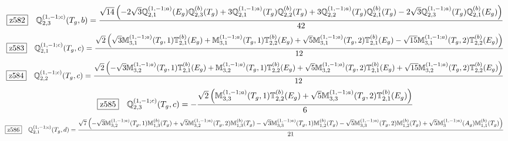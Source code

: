 \documentclass[fleqn,10pt,landscape]{jsarticle}
\begin{document}
\begin{dmath*}
\hspace*{3mm}\fbox{z582}\quad \mathbb{Q}_{2,3}^{(1,-1;c)}(T_{g},b)=\frac{\sqrt{14} \left(- 2 \sqrt{3} \mathbb{Q}_{2,1}^{(1,-1;a)}(E_{g}) \mathbb{Q}_{2,3}^{(b)}(T_{g}) + 3 \mathbb{Q}_{2,1}^{(1,-1;a)}(T_{g}) \mathbb{Q}_{2,2}^{(b)}(T_{g}) + 3 \mathbb{Q}_{2,2}^{(1,-1;a)}(T_{g}) \mathbb{Q}_{2,1}^{(b)}(T_{g}) - 2 \sqrt{3} \mathbb{Q}_{2,3}^{(1,-1;a)}(T_{g}) \mathbb{Q}_{2,1}^{(b)}(E_{g})\right)}{42}
\end{dmath*}
\begin{dmath*}
\hspace*{3mm}\fbox{z583}\quad \mathbb{Q}_{2,1}^{(1,-1;c)}(T_{g},c)=\frac{\sqrt{2} \left(\sqrt{3} \mathbb{M}_{3,1}^{(1,-1;a)}(T_{g},1) \mathbb{T}_{2,1}^{(b)}(E_{g}) + \mathbb{M}_{3,1}^{(1,-1;a)}(T_{g},1) \mathbb{T}_{2,2}^{(b)}(E_{g}) + \sqrt{5} \mathbb{M}_{3,1}^{(1,-1;a)}(T_{g},2) \mathbb{T}_{2,1}^{(b)}(E_{g}) - \sqrt{15} \mathbb{M}_{3,1}^{(1,-1;a)}(T_{g},2) \mathbb{T}_{2,2}^{(b)}(E_{g})\right)}{12}
\end{dmath*}
\begin{dmath*}
\hspace*{3mm}\fbox{z584}\quad \mathbb{Q}_{2,2}^{(1,-1;c)}(T_{g},c)=\frac{\sqrt{2} \left(- \sqrt{3} \mathbb{M}_{3,2}^{(1,-1;a)}(T_{g},1) \mathbb{T}_{2,1}^{(b)}(E_{g}) + \mathbb{M}_{3,2}^{(1,-1;a)}(T_{g},1) \mathbb{T}_{2,2}^{(b)}(E_{g}) + \sqrt{5} \mathbb{M}_{3,2}^{(1,-1;a)}(T_{g},2) \mathbb{T}_{2,1}^{(b)}(E_{g}) + \sqrt{15} \mathbb{M}_{3,2}^{(1,-1;a)}(T_{g},2) \mathbb{T}_{2,2}^{(b)}(E_{g})\right)}{12}
\end{dmath*}
\begin{dmath*}
\hspace*{3mm}\fbox{z585}\quad \mathbb{Q}_{2,3}^{(1,-1;c)}(T_{g},c)=- \frac{\sqrt{2} \left(\mathbb{M}_{3,3}^{(1,-1;a)}(T_{g},1) \mathbb{T}_{2,2}^{(b)}(E_{g}) + \sqrt{5} \mathbb{M}_{3,3}^{(1,-1;a)}(T_{g},2) \mathbb{T}_{2,1}^{(b)}(E_{g})\right)}{6}
\end{dmath*}
\begin{dmath*}
\hspace*{3mm}\fbox{z586}\quad \mathbb{Q}_{2,1}^{(1,-1;c)}(T_{g},d)=\frac{\sqrt{7} \left(- \sqrt{3} \mathbb{M}_{3,2}^{(1,-1;a)}(T_{g},1) \mathbb{M}_{1,3}^{(b)}(T_{g}) + \sqrt{5} \mathbb{M}_{3,2}^{(1,-1;a)}(T_{g},2) \mathbb{M}_{1,3}^{(b)}(T_{g}) - \sqrt{3} \mathbb{M}_{3,3}^{(1,-1;a)}(T_{g},1) \mathbb{M}_{1,2}^{(b)}(T_{g}) - \sqrt{5} \mathbb{M}_{3,3}^{(1,-1;a)}(T_{g},2) \mathbb{M}_{1,2}^{(b)}(T_{g}) + \sqrt{5} \mathbb{M}_{3}^{(1,-1;a)}(A_{g}) \mathbb{M}_{1,1}^{(b)}(T_{g})\right)}{21}
\end{dmath*}
\end{document}

